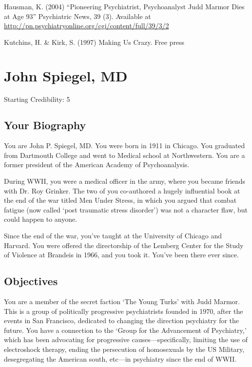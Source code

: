 \begin{refsection}
Hausman, K. (2004) “Pioneering Psychiatrist, Psychoanalyst Judd Marmor Dies at Age 93” Psychiatric News, 39 (3). Available at \url{http://pn.psychiatryonline.org/cgi/content/full/39/3/2}

Kutchins, H. \& Kirk, S. (1997) Making Us Crazy. Free press

\chapter{John Spiegel, MD}
\label{johnspiegelmd}

Starting Credibility: 5

\section{Your Biography}
\label{yourbiography}

You are John P. Spiegel, MD. You were born in 1911 in Chicago. You graduated from Dartmouth College and went to Medical school at Northwestern. You are a former president of the American Academy of Psychoanalysis.

During WWII, you were a medical officer in the army, where you became friends with Dr. Roy Grinker. The two of you co-authored a hugely influential book at the end of the war titled Men Under Stress, in which you argued that combat fatigue (now called `post traumatic stress disorder') was not a character flaw, but could happen to anyone.

Since the end of the war, you've taught at the University of Chicago and Harvard. You were offered the directorship of the Lemberg Center for the Study of Violence at Brandeis in 1966, and you took it. You've been there ever since.

\section{Objectives}
\label{objectives}

You are a member of the secret faction `The Young Turks' with Judd Marmor. This is a group of politically progressive psychiatrists founded in 1970, after the events in San Francisco, dedicated to changing the direction psychiatry for the future. You have a connection to the `Group for the Advancement of Psychiatry,' which has been advocating for progressive causes—specifically, limiting the use of electroshock therapy, ending the persecution of homosexuals by the US Military, desegregating the American south, etc—in psychiatry since the end of WWII. 


\end{refsection}
